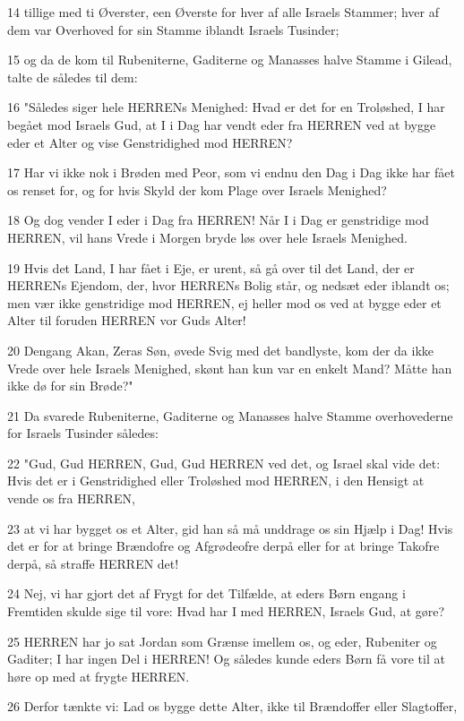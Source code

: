 \par 14 tillige med ti Øverster, een Øverste for hver af alle Israels Stammer; hver af dem var Overhoved for sin Stamme iblandt Israels Tusinder;
\par 15 og da de kom til Rubeniterne, Gaditerne og Manasses halve Stamme i Gilead, talte de således til dem:
\par 16 "Således siger hele HERRENs Menighed: Hvad er det for en Troløshed, I har begået mod Israels Gud, at I i Dag har vendt eder fra HERREN ved at bygge eder et Alter og vise Genstridighed mod HERREN?
\par 17 Har vi ikke nok i Brøden med Peor, som vi endnu den Dag i Dag ikke har fået os renset for, og for hvis Skyld der kom Plage over Israels Menighed?
\par 18 Og dog vender I eder i Dag fra HERREN! Når I i Dag er genstridige mod HERREN, vil hans Vrede i Morgen bryde løs over hele Israels Menighed.
\par 19 Hvis det Land, I har fået i Eje, er urent, så gå over til det Land, der er HERRENs Ejendom, der, hvor HERRENs Bolig står, og nedsæt eder iblandt os; men vær ikke genstridige mod HERREN, ej heller mod os ved at bygge eder et Alter til foruden HERREN vor Guds Alter!
\par 20 Dengang Akan, Zeras Søn, øvede Svig med det bandlyste, kom der da ikke Vrede over hele Israels Menighed, skønt han kun var en enkelt Mand? Måtte han ikke dø for sin Brøde?"
\par 21 Da svarede Rubeniterne, Gaditerne og Manasses halve Stamme overhovederne for Israels Tusinder således:
\par 22 "Gud, Gud HERREN, Gud, Gud HERREN ved det, og Israel skal vide det: Hvis det er i Genstridighed eller Troløshed mod HERREN, i den Hensigt at vende os fra HERREN,
\par 23 at vi har bygget os et Alter, gid han så må unddrage os sin Hjælp i Dag! Hvis det er for at bringe Brændofre og Afgrødeofre derpå eller for at bringe Takofre derpå, så straffe HERREN det!
\par 24 Nej, vi har gjort det af Frygt for det Tilfælde, at eders Børn engang i Fremtiden skulde sige til vore: Hvad har I med HERREN, Israels Gud, at gøre?
\par 25 HERREN har jo sat Jordan som Grænse imellem os, og eder, Rubeniter og Gaditer; I har ingen Del i HERREN! Og således kunde eders Børn få vore til at høre op med at frygte HERREN.
\par 26 Derfor tænkte vi: Lad os bygge dette Alter, ikke til Brændoffer eller Slagtoffer,
